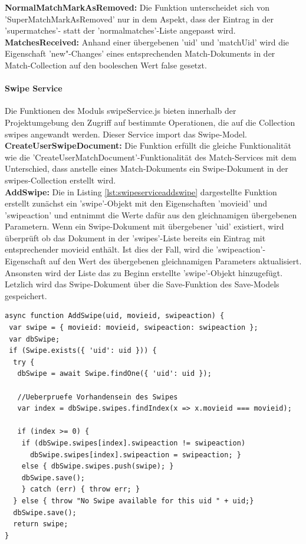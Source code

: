 \noindent
\textbf{NormalMatchMarkAsRemoved:}
Die Funktion unterscheidet sich von 'SuperMatchMarkAsRemoved' nur in dem Aspekt, dass der  Eintrag in der 'supermatches'- statt der 'normalmatches'-Liste angepasst wird.\\

\noindent
\textbf{MatchesReceived:}
Anhand einer übergebenen 'uid' und 'matchUid' wird die Eigenschaft 'new"-Changes' eines entsprechenden Match-Dokuments in der Match-Collection auf den booleschen Wert false gesetzt. 



%
%

\paragraph{Swipe Service}
Die Funktionen des Moduls swipeService.js bieten innerhalb der Projektumgebung den Zugriff auf bestimmte Operationen, die auf die Collection swipes angewandt werden. Dieser Service import das Swipe-Model.\\

\noindent
\textbf{CreateUserSwipeDocument:}
Die Funktion erfüllt die gleiche Funktionalität wie die 'Create\-UserMatchDocument'-Funktionalität des Match-Services mit dem Unterschied, dass anstelle eines Match-Dokuments ein Swipe-Dokument in der swipes-Collection erstellt wird.\\

\noindent
\textbf{AddSwipe:}
Die in Listing \ref{lst:swipeserviceaddswipe} dargestellte Funktion erstellt zunächst ein 'swipe'-Objekt mit den Eigenschaften 'movieid' und 'swipeaction' und entnimmt die Werte dafür aus den gleichnamigen übergebenen Parametern. 
Wenn ein Swipe-Dokument mit übergebener 'uid' existiert, wird überprüft ob das Dokument in der 'swipes'-Liste bereits ein Eintrag mit entsprechender movieid enthält. Ist dies der Fall, wird die 'swipeaction'-Eigenschaft auf den Wert des übergebenen gleichnamigen Parameters aktualisiert. Ansonsten wird der Liste das zu Beginn erstellte 'swipe'-Objekt hinzugefügt. Letzlich wird das Swipe-Dokument über die Save-Funktion des Save-Models gespeichert.

\begin{lstlisting}[caption=Swipe Service - AddSwipe, label=lst:swipeserviceaddswipe]
async function AddSwipe(uid, movieid, swipeaction) {
 var swipe = { movieid: movieid, swipeaction: swipeaction };
 var dbSwipe;
 if (Swipe.exists({ 'uid': uid })) {
  try {
   dbSwipe = await Swipe.findOne({ 'uid': uid });

   //Ueberpruefe Vorhandensein des Swipes
   var index = dbSwipe.swipes.findIndex(x => x.movieid === movieid);

   if (index >= 0) {
    if (dbSwipe.swipes[index].swipeaction != swipeaction)
      dbSwipe.swipes[index].swipeaction = swipeaction; }
    else { dbSwipe.swipes.push(swipe); }
    dbSwipe.save(); 
    } catch (err) { throw err; }
  } else { throw "No Swipe available for this uid " + uid;}
  dbSwipe.save();
  return swipe;
}
\end{lstlisting}

